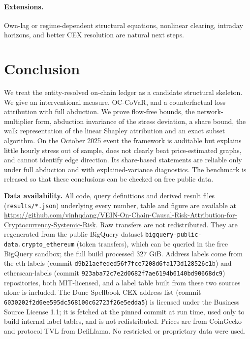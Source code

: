 \documentclass[referee,pdflatex,sn-mathphys-ay]{sn-jnl}
\theoremstyle{thmstyleone}%
\theoremstyle{thmstyletwo}%
\theoremstyle{thmstylethree}%
\begin{document}
\paragraph{Extensions.} Own-lag or regime-dependent structural equations, nonlinear clearing, intraday horizons, and better CEX resolution
are natural next steps.

\section{Conclusion}
\label{sec:conclusion}
We treat the entity-resolved on-chain ledger as a candidate structural skeleton. We give an interventional measure, OC-CoVaR, and a
counterfactual loss attribution with full abduction. We prove flow-free bounds, the network-multiplier form, abduction invariance of
the stress deviation, a share bound, the walk representation of the linear Shapley attribution and an exact subset algorithm. On the
October 2025 event the framework is auditable but explains little hourly stress out of sample, does not clearly beat price-estimated
graphs, and cannot identify edge direction. Its share-based statements are reliable only under full abduction and with
explained-variance diagnostics. The benchmark is released so that these conclusions can be checked on free public data.

\backmatter


\noindent\textbf{Data availability.} All code, query definitions and derived result files (\texttt{results/*.json}) underlying
every number, table and figure are available at \url{https://github.com/vinhqdang/VEIN-On-Chain-Causal-Risk-Attribution-for-Cryptocurrency-Systemic-Risk}.
Raw transfers are not redistributed. They are regenerated from the public BigQuery dataset \texttt{bigquery-public-data.crypto\_ethereum}
(token transfers), which can be queried in the free BigQuery sandbox; the full build processed 327 GiB. Address labels come
from the eth-labels (commit \texttt{d9b21aefeded56f7fce7208d6fa173d128526c1b}) and etherscan-labels (commit \texttt{923aba72c7e2d0682f7ae6194b6140bd90668dc9}) repositories, both
MIT-licensed, and a label table built from these two sources alone is included. The Dune Spellbook CEX address list (commit
\texttt{6030202f2d6ee595dc568100c62723f26e5edda5}) is licensed under the Business Source License 1.1; it is fetched at the pinned commit at run time, used
only to build internal label tables, and is not redistributed. Prices are from CoinGecko and protocol TVL from DefiLlama. No
restricted or proprietary data were used.
\end{document}

